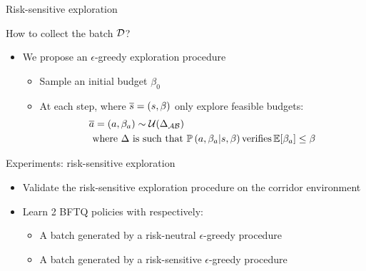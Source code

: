 \documentclass{beamer}
\begin{document}
    \begin{frame}{Risk-sensitive exploration}

        How to collect the batch $\mathcal{D}$?

        \begin{itemize}
            \item We propose an $\epsilon$-greedy exploration procedure
            \begin{itemize}
                \pause\item Sample an initial budget $\beta_0$
                \pause\item At each step, where $\overline{s}=(s,\beta)$ only explore feasible budgets:
                \pause\begin{align*}
                          &\overline{a} = (a, \beta_a)\sim\mathcal{U}(\Delta_{\mathcal{A}\mathcal{B}})\\
                          &\text{ where }  \Delta \text{ is such that }\mathbb{P}\left(a, \beta_a|s, \beta\right) \text{verifies} \operatorname*{\mathbb{E}}[\beta_a]\leq\beta
                \end{align*}
            \end{itemize}
        \end{itemize}


    \end{frame}

    \begin{frame}{Experiments: risk-sensitive exploration}

        \begin{itemize}
            \item Validate the risk-sensitive exploration procedure on the corridor environment
            \pause\item Learn 2 BFTQ policies with respectively:
            \begin{itemize}
                \item A batch generated by a risk-neutral $\epsilon$-greedy procedure
                \item A batch generated by a risk-sensitive $\epsilon$-greedy procedure
            \end{itemize}
        \end{itemize}
    \end{frame}
\end{document}
